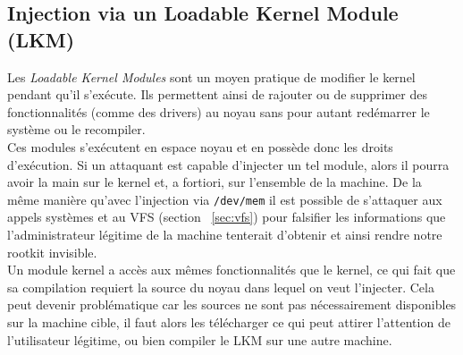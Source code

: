 \documentclass[11pt]{article}
\begin{document}

    \subsection{Injection via un Loadable Kernel Module (LKM)}

        Les \textit{Loadable Kernel Modules} sont un moyen pratique de modifier le kernel pendant qu'il s'exécute. Ils permettent ainsi de rajouter ou de supprimer des fonctionnalités (comme des drivers) au noyau sans pour autant redémarrer le système ou le recompiler. \\
        
        Ces modules s'exécutent en espace noyau et en possède donc les droits d'exécution. Si un attaquant est capable d'injecter un tel module, alors il pourra avoir la main sur le kernel et, a fortiori, sur l'ensemble de la machine. De la même manière qu'avec l'injection via \texttt{/dev/mem} il est possible de s'attaquer aux appels systèmes et au VFS (section ~\ref{sec:vfs}) pour falsifier les informations que l'administrateur légitime de la machine tenterait d'obtenir et ainsi rendre notre rootkit invisible. \\
        
        Un module kernel a accès aux mêmes fonctionnalités que le kernel, ce qui fait que sa compilation requiert la source du noyau dans lequel on veut l'injecter. Cela peut devenir problématique car les sources ne sont pas nécessairement disponibles sur la machine cible, il faut alors les télécharger ce qui peut attirer l'attention de l'utilisateur légitime, ou bien compiler le LKM sur une autre machine. \\
        
\end{document}
